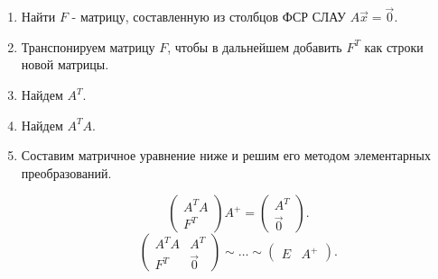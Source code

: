 \begin{enumerate}
    \item Найти $F$ - матрицу, составленную из столбцов ФСР СЛАУ $A\vec{x} = \vec{0}$.
    \item Транспонируем матрицу $F$, чтобы в дальнейшем добавить $F^T$ как строки новой матрицы.
    \item Найдем $A^T$.
    \item Найдем $A^TA$.
    \item Составим матричное уравнение ниже и решим его методом элементарных преобразований.

    \begin{equation*}
        \left(\begin{array}{c}
            A^TA \\
            F^T
        \end{array}\right)A^+
        =
        \left(\begin{array}{c}
            A^T \\
            \vec{0}
        \end{array}\right)
    .\end{equation*}
    \begin{equation*}
        \left(\begin{array}{c|c}
            A^TA & A^T \\
            F^T & \vec{0}
        \end{array}\right)
        \sim \ldots \sim
        \left(\begin{array}{c|c}
            E & A^+
        \end{array}\right)
    .\end{equation*}
\end{enumerate}
